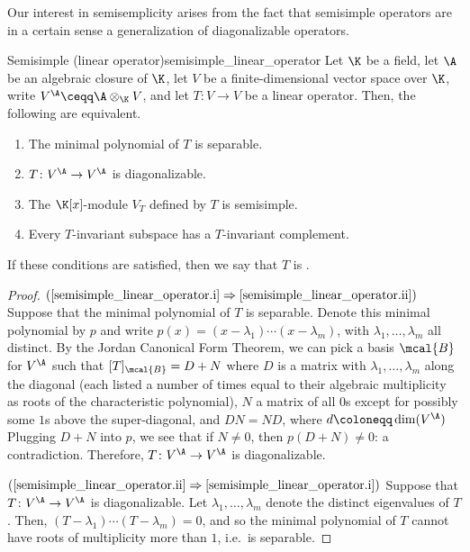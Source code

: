 Our interest in semisemplicity arises from the fact that semisimple operators are in a certain sense a generalization of diagonalizable operators.
\begin{thm}{Semisimple (linear operator)}{semisimple_linear_operator}
	Let $\K$ be a field, let $\A$ be an algebraic closure of $\K$, let $V$ be a finite-dimensional vector space over $\K$, write $V^{\A}\ceqq \A \otimes _{\K}V$, and let $T\colon V\rightarrow V$ be a linear operator.  Then, the following are equivalent.
	\begin{enumerate}
		\item \label{semisimple_linear_operator.i}The minimal polynomial of $T$ is separable.
		\item \label{semisimple_linear_operator.ii}$T\colon V^{\A}\rightarrow V^{\A}$ is diagonalizable.
		\item \label{semisimple_linear_operator.iii}The $\K [x]$-module $V_T$ defined by $T$ is semisimple.
		\item \label{semisimple_linear_operator.iv}Every $T$-invariant subspace has a $T$-invariant complement.
	\end{enumerate}
	\begin{rmk}
		If these conditions are satisfied, then we say that $T$ is .
	\end{rmk}
	\begin{proof}
		$(\cref{semisimple_linear_operator.i}\Rightarrow \cref{semisimple_linear_operator.ii})$ Suppose that the minimal polynomial of $T$ is separable.  Denote this minimal polynomial by $p$ and write $p(x)=(x-\lambda _1)\cdots (x-\lambda _m)$, with $\lambda _1,\ldots ,\lambda _m$ all distinct.  By the Jordan Canonical Form Theorem, we can pick a basis $\mcal{B}$ for $V^{\A}$ such that $[T]_{\mcal{B}}=D+N$ where $D$ is a matrix with $\lambda _1,\ldots ,\lambda _m$ along the diagonal (each listed a number of times equal to their algebraic multiplicity as roots of the characteristic polynomial), $N$ a matrix of all $0$s except for possibly some $1$s above the super-diagonal, and $DN=ND$, where $d\coloneqq \dim (V^{\A})$  Plugging $D+N$ into $p$, we see that if $N\neq 0$, then $p(D+N)\neq 0$:  a contradiction.  Therefore, $T\colon V^{\A}\rightarrow V^{\A}$ is diagonalizable.
		
		\blankline
		\noindent
		$(\cref{semisimple_linear_operator.ii}\Rightarrow \cref{semisimple_linear_operator.i})$ Suppose that $T\colon V^{\A}\rightarrow V^{\A}$ is diagonalizable.  Let $\lambda _1,\ldots ,\lambda _m$ denote the distinct eigenvalues of $T$.  Then, $(T-\lambda _1)\cdots (T-\lambda _m)=0$, and so the minimal polynomial of $T$ cannot have roots of multiplicity more than $1$, i.e.~is separable.
		

\end{proof}
\end{thm}
